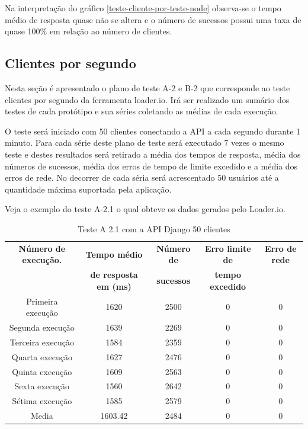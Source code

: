   Na interpretação do gráfico \ref{teste-cliente-por-teste-node}  observa-se o tempo médio de resposta quase não se altera
  e o número de sucessos possui uma taxa de quase 100\% em relação ao número de clientes.

\subsection{Clientes por segundo}

  Nesta seção é apresentado o plano de teste A-2 e B-2 que corresponde ao teste clientes por segundo da ferramenta loader.io. Irá
  ser realizado um sumário dos testes de cada protótipo e sua séries coletando as médias de cada execução.

  O teste será iniciado com 50 clientes conectando a API a cada segundo durante 1 minuto. Para cada série deste plano de teste
  será executado 7 vezes o mesmo teste e destes resultados será retirado a média dos tempos de resposta, média dos números de
  sucessos, média dos erros de tempo de limite excedido e a média dos erros de rede. No decorrer de cada séria será acrescentado
  50 usuários até a quantidade máxima suportada pela aplicação.

  Veja o exemplo do teste A-2.1 o qual obteve os dados gerados pelo Loader.io.

  \begin{table}[H]
    \centering
    \footnotesize
    \setlength{\abovecaptionskip}{0pt}
    \setlength{\belowcaptionskip}{0pt}
    \caption[Teste A-2.1 com a API Django 50 clientes]{Teste A 2.1 com a API Django 50 clientes}
    \label{tab:teste-a-2-1}
    \begin{tabular}{c|c|c|c|c}
      \hline \hline
      \textbf{Número de execução.} & \textbf{Tempo médio } &	\textbf{Número de } & \textbf{Erro limite de} & \textbf{Erro de rede}  \\
	    {}			   & \textbf{de resposta em (ms) } &\textbf{sucessos } & \textbf{tempo excedido} & {}  \\
      \hline \hline
      Primeira execução &	1620 &				2500 &			0 &				0 \\
      Segunda execução &	1639 &				2269 &			0 &				0 \\
      Terceira execução &	1584 &				2359 &			0 &				0 \\
      Quarta execução  &	1627 &				2476 &			0 &				0 \\
      Quinta execução  &	1609 &				2563 &			0 &				0 \\
      Sexta execução   &	1560 &				2642 &			0 &				0 \\
      Sétima execução  &	1585 &				2579 &			0 &				0 \\
      Media & 			1603.42 &			2484 & 			0 &				0 \\
      \hline \hline
    \end{tabular}
  \end{table}


